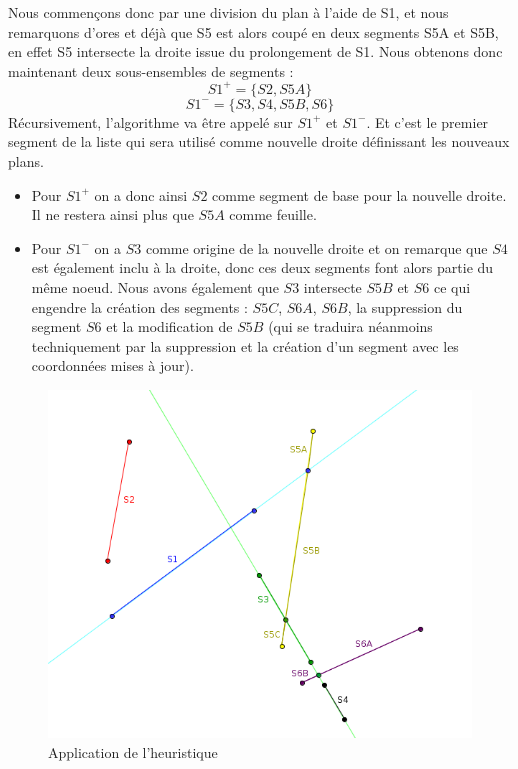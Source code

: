\documentclass[11pt,a4paper]{article}
\begin{document}
Nous commençons donc par une division du plan à l'aide de S1, et nous remarquons d'ores et déjà que S5 est alors coupé en deux segments S5A et S5B, en effet S5 intersecte la droite issue du prolongement de S1. Nous obtenons donc maintenant deux sous-ensembles de segments : 
$$S1^+ = \{S2, S5A\}$$
$$S1^- = \{S3,S4,S5B,S6\}$$
Récursivement, l'algorithme va être appelé sur $S1^+$ et $S1^-$. Et c'est le premier segment de la liste qui sera utilisé comme nouvelle droite définissant les nouveaux plans. 
\begin{itemize}
\item Pour $S1^+$ on a donc ainsi $S2$ comme segment de base pour la nouvelle droite. Il ne restera ainsi plus que $S5A$ comme feuille. 
\item Pour $S1^-$ on a $S3$ comme origine de la nouvelle droite et on remarque que $S4$ est également inclu à la droite, donc ces deux segments font alors partie du même noeud. Nous avons également que $S3$ intersecte $S5B$ et $S6$ ce qui engendre la création des segments : $S5C$, $S6A$, $S6B$, la suppression du segment $S6$ et la modification de $S5B$ (qui se traduira néanmoins techniquement par la suppression et la création d'un segment avec les coordonnées mises à jour). 
\end{itemize}

\begin{figure}[!h]
\centering
\includegraphics[scale=0.6]{bsp_ex_2.png}
\caption{Application de l'heuristique}
\label{bsp_inordre}
\end{figure}
\end{document}
